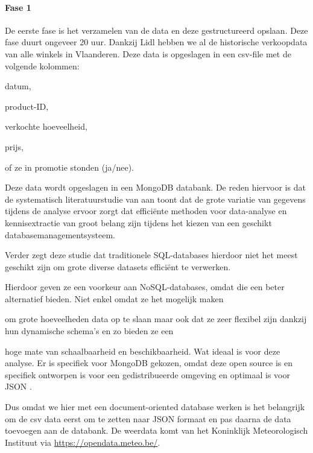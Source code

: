 \documentclass{hogent-article}
\begin{document}
    \label{sec:methodologie}
    
    \paragraph{Fase 1}
    
    De eerste fase is het verzamelen van de data en deze gestructureerd opslaan. Deze fase duurt ongeveer 20 uur.  Dankzij Lidl hebben we al de historische verkoopdata van alle winkels in Vlaanderen. Deze data is opgeslagen in een csv-file met de volgende kolommen:
    
    \begin{inparaenum}[(i)]
        \item datum,
        \item product-ID,
        \item verkochte hoeveelheid,
        \item prijs,
        \item of ze in promotie stonden (ja/nee).
  
    \end{inparaenum}
    
    Deze data wordt opgeslagen in een MongoDB databank. De reden hiervoor is dat  
    de systematisch literatuurstudie van \textcite{Khan2022} aan toont dat de grote variatie van gegevens tijdens de analyse ervoor zorgt dat efficiënte methoden voor
    data-analyse en kennisextractie van groot belang zijn tijdens het kiezen van een geschikt databasemanagementsysteem.
    
    Verder zegt deze studie dat traditionele SQL-databases hierdoor niet het meest geschikt zijn om grote diverse datasets efficiënt te verwerken.
    
    Hierdoor geven ze een voorkeur aan NoSQL-databases, omdat die een beter alternatief bieden. Niet enkel omdat ze het mogelijk maken
    
    om grote hoeveelheden data op te slaan maar ook dat ze zeer flexibel zijn dankzij hun dynamische schema's en zo bieden ze een
    
    hoge mate van schaalbaarheid en beschikbaarheid. Wat ideaal is voor deze analyse. Er is specifiek voor MongoDB gekozen, omdat deze open source is en specifiek ontworpen is voor een gedistribueerde omgeving en optimaal is voor JSON \textcite{Khan2022}.
    
    Dus omdat we hier met een document-oriented database werken is het belangrijk om de csv data eerst om te zetten naar JSON formaat en pas daarna de data toevoegen aan de databank. De weerdata komt van het Koninklijk Meteorologisch Instituut via \url{https://opendata.meteo.be/}.
    
\end{document}

